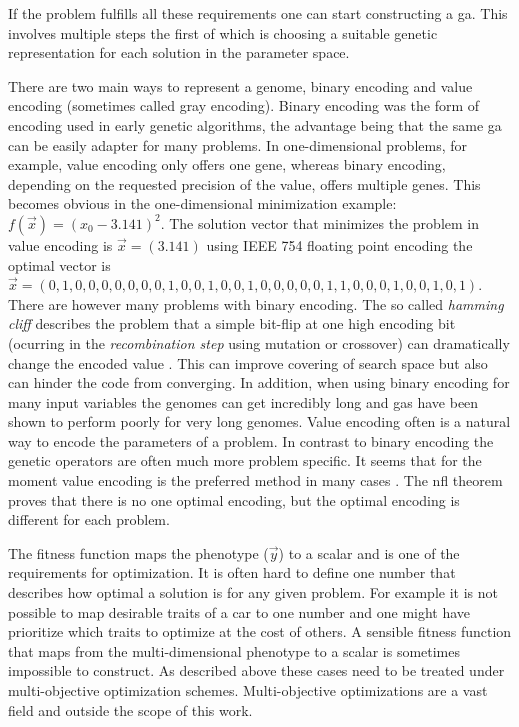 If the problem fulfills all these requirements one can start constructing a \gls{ga}. This involves multiple steps the first of which is choosing a suitable genetic representation for each solution in the parameter space. 

There are two main ways to represent a \gls{genome}, binary encoding and value encoding (sometimes called gray encoding). Binary encoding was the form of encoding  used in early genetic algorithms, the advantage being that the same \gls{ga} can be easily adapter for many problems. In one-dimensional problems, for example, value encoding only offers one gene, whereas binary encoding, depending on the requested precision of the value, offers multiple genes. This becomes obvious in the one-dimensional minimization example: $f(\vec{x})=(x_0 - 3.141)^2$. The solution vector that minimizes the problem in value encoding is $\vec{x} = (3.141)$ using IEEE 754 floating point encoding the optimal vector is $\vec{x}=(0,1,0,0,0,0,0,0,0,1,0,0,1,0,0,1,0,0,0,0,0,1,1,0,0,0,1,0,0,1,0,1)$.
There are however many problems with binary encoding. The so called \textit{hamming cliff} describes the problem that a simple bit-flip at one high encoding bit (ocurring in the \textit{recombination step} using \gls{mutation} or \gls{crossover}) can dramatically change the encoded value \citep[e.g.][]{Chakraborty2003253}. This can improve covering of search space but also can hinder the code from converging. In addition, when using binary encoding for many input variables the genomes can get incredibly long and \glspl{ga} have been shown to perform poorly for very long genomes. Value encoding often is a natural way to encode the parameters of a problem. In contrast to binary encoding the genetic operators are often much more problem specific. It seems that for the moment value encoding is the preferred method in many cases \citep[e.g.][]{Janikow1991Comparison,Wright91geneticalgorithms,Goldberg90real-codedgenetic}. The \gls{nfl} theorem proves that there is no one optimal encoding, but the optimal encoding is different for each problem.

The fitness function maps the phenotype ($\vec{y}$) to a scalar and is one of the requirements for optimization. It is often hard to define one number that describes how optimal a solution is for any given problem. For example it is not possible to map desirable traits of a car to one number and one might have prioritize which traits to optimize at the cost of others. A sensible \gls{fitness} function that maps from the multi-dimensional \gls{phenotype} to a scalar is sometimes impossible to construct. As described above these cases need to be treated under multi-objective optimization schemes. Multi-objective optimizations are a vast field and outside the scope of this work. 

